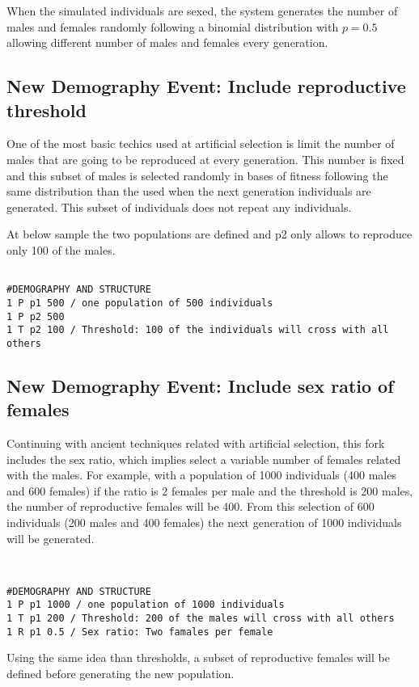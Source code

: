 \documentclass{article}
\begin{document}
When the simulated individuals are sexed, the system generates the number of males and females randomly following a binomial distribution with $p=0.5$ allowing different number of males and females every generation.

\subsection{New Demography Event: Include reproductive threshold}

One of the most basic techics used at artificial selection is limit the number of males that are going to be reproduced at every generation. This number is fixed and this subset of males is selected randomly in bases of fitness following the same distribution than the used when the next generation individuals are generated. This subset of individuals does not repeat any individuals.

At below sample the two populations are defined and p2 only allows to reproduce only 100 of the males.

\begin{verbatim}

#DEMOGRAPHY AND STRUCTURE
1 P p1 500 / one population of 500 individuals
1 P p2 500
1 T p2 100 / Threshold: 100 of the individuals will cross with all others

\end{verbatim}

\subsection{New Demography Event: Include sex ratio of females}

Continuing with ancient techniques related with artificial selection, this fork includes the sex ratio, which implies select a variable number of females related with the males. For example, with a population of 1000 individuals (400 males and 600 females) if the ratio is 2 females per male and the threshold is 200 males, the number of reproductive females will be 400. From this selection of 600 individuals (200 males and 400 females) the next generation of 1000 individuals will be generated.

\begin{verbatim}


#DEMOGRAPHY AND STRUCTURE
1 P p1 1000 / one population of 1000 individuals
1 T p1 200 / Threshold: 200 of the males will cross with all others
1 R p1 0.5 / Sex ratio: Two famales per female

\end{verbatim}


Using the same idea than thresholds, a subset of reproductive females will be defined before generating the new population.
\end{document}
